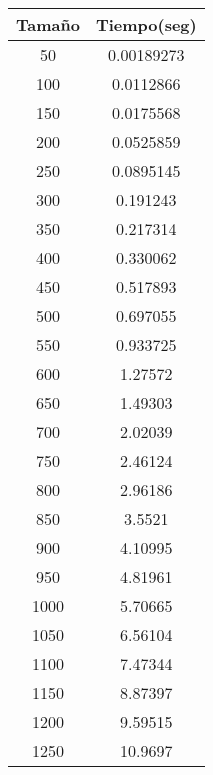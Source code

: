 \begin{longtable}{|c|c|}
\hline
\textbf{Tamaño} & \textbf{Tiempo(seg)} \\ \hline
50     & 0.00189273  \\ \hline
100    & 0.0112866   \\ \hline
150    & 0.0175568   \\ \hline
200    & 0.0525859   \\ \hline
250    & 0.0895145   \\ \hline
300    & 0.191243    \\ \hline
350    & 0.217314    \\ \hline
400    & 0.330062    \\ \hline
450    & 0.517893    \\ \hline
500    & 0.697055    \\ \hline
550    & 0.933725    \\ \hline
600    & 1.27572     \\ \hline
650    & 1.49303     \\ \hline
700    & 2.02039     \\ \hline
750    & 2.46124     \\ \hline
800    & 2.96186     \\ \hline
850    & 3.5521      \\ \hline
900    & 4.10995     \\ \hline
950    & 4.81961     \\ \hline
1000   & 5.70665     \\ \hline
1050   & 6.56104     \\ \hline
1100   & 7.47344     \\ \hline
1150   & 8.87397     \\ \hline
1200   & 9.59515     \\ \hline
1250   & 10.9697     \\ \hline
\end{longtable}

